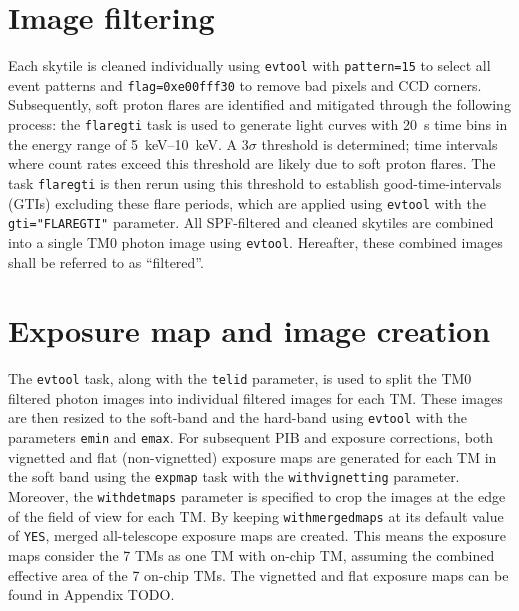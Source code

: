 \section{Image filtering}
Each skytile is cleaned individually using \texttt{evtool} with \texttt{pattern=15} to select all event patterns and \texttt{flag=0xe00fff30} to remove bad pixels and CCD corners. Subsequently, soft proton flares are identified and mitigated through the following process: the \texttt{flaregti} task is used to generate light curves with \SI{20}{\second} time bins in the energy range of \SIrange{5}{10}{\kilo\electronvolt}. A \(3\sigma\) threshold is determined; time intervals where count rates exceed this threshold are likely due to soft proton flares. The task \texttt{flaregti} is then rerun using this threshold to establish good-time-intervals (GTIs) excluding these flare periods, which are applied using \texttt{evtool} with the \texttt{gti="FLAREGTI"} parameter. All SPF-filtered and cleaned skytiles are combined into a single TM0 photon image using \texttt{evtool}. Hereafter, these combined images shall be referred to as \enquote{filtered}.
%
\section{Exposure map and image creation}\label{sec:exposure_map}
The \texttt{evtool} task, along with the \texttt{telid} parameter, is used to split the TM0 filtered photon images into individual filtered images for each TM. These images are then resized to the soft-band and the hard-band using \texttt{evtool} with the parameters \texttt{emin} and \texttt{emax}. For subsequent PIB and exposure corrections, both vignetted and flat (non-vignetted) exposure maps are generated for each TM in the soft band using the \texttt{expmap} task with the \texttt{withvignetting} parameter. Moreover, the \texttt{withdetmaps} parameter is specified to crop the images at the edge of the field of view for each TM. By keeping \texttt{withmergedmaps} at its default value of \texttt{YES}, merged all-telescope exposure maps are created. This means the exposure maps consider the 7 TMs as one TM with on-chip TM, assuming the combined effective area of the 7 on-chip TMs. The vignetted and flat exposure maps can be found in Appendix TODO.
